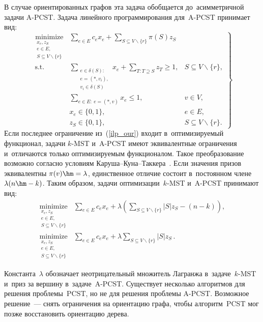 \begin{multicols}{2}
В случае ориентированных графов эта задача обобщается до~асимметричной задачи 
A-PCST. Задача линейного программирования для~A-PCST принимает вид:
\begin{equation}
\left.
\begin{array}{rll}
\!\!\!\underset{\substack{x_e,z_S \\ e\in E,\\ S\subseteq V\backslash \{r\}}}{\mbox{minimize}} & 
\displaystyle \sum\limits_{e\in E} c_e x_e + \sum\limits_{S\subseteq V\backslash\{r\}}  \!\!\!\!\!\pi(S)z_S &\\[6pt]
\!\!\!\mbox{s.t.} & \displaystyle \sum\limits_{\substack{e\in\delta(S):\\e=(\ast,v_i),\\ v_i\in\delta(S)}} \!\!\!\!\!\! x_e + 
\!\sum\limits_{T:T\supseteq S}  \!\!\! z_T\geqslant 1, & S\subseteq  V\backslash \{r\},\\[6pt]
\!\!\!& \displaystyle \sum\limits_{e\in E:~e=(\ast,v)} \!\!\!\!\!\!\!\! x_e\leqslant 1, & v\in V,\\[6pt]
\!\!\!& x_e\in\{0,1\}, & e\in E,\\[6pt]
\!\!\!& z_S\in\{0,1\}, & S\subseteq V\backslash \{r\}.
\end{array}\!
\right\}\!
\label{ilp_pcst_ord}
\end{equation}
Если последнее ограничение из~(\ref{ilp_our}) входит в~оптимизируемый 
функционал, задачи $k$-MST и~A-PCST имеют эквивалентные 
ограничения и~отличаются только оптимизируемым функционалом. Такое 
преобразование возможно согласно условиям Ка\-ру\-ша--Ку\-на--Так\-ке\-ра~\cite{ras2017approximate}. Если значения призов 
эквивалентны $\pi(v) \hm=  \lambda$, единственное отличие состоит в~постоянном члене~$\lambda(n\hm-k)$. Таким 
образом, задачи оптимизации~$k$-MST и~A-PCST принимают вид:
\begin{align*}
\underset{\substack{x_e,z_S \\ e\in E,\\ S\subseteq V\backslash \{r\}}}{\mbox{minimize}} & 
\sum\limits_{e\in E}c_ex_e + \lambda\left(\sum\limits_{S\subseteq V\backslash \{r\}}|S|z_S - (n-k)\right),\\ 
\underset{\substack{x_e,z_S \\ e\in E,\\ S\subseteq V\backslash \{r\}}}{\mbox{minimize}} & 
\sum\limits_{e\in E}c_ex_e + \lambda\sum\limits_{S\subseteq V\backslash\{r\}}|S|z_S\,. 
\end{align*}

Константа~$\lambda$ обозначает неотрицательный множитель Лагранжа в~задаче~$k$-MST и~приз за вершину 
в~задаче~A-PCST. 
Существует несколько алгоритмов для решения проблемы~PCST, но не для 
решения проб\-ле\-мы A-PCST. Возможное решение~--- снять 
ограничения на ориентацию графа, чтобы алгоритм~PCST мог позже 
восстановить ориентацию дерева.


\end{multicols}
